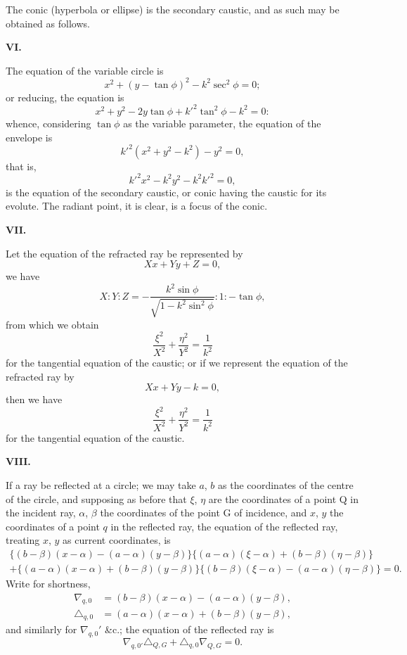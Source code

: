 \documentclass[11pt,a4paper]{article}
\begin{document}
The conic (hyperbola or ellipse) is the secondary caustic, and as such may be
obtained as follows.

\medskip
\noindent\textbf{VI.}

The equation of the variable circle is
\[x^2 + (y - \tan\phi)^2 - k^2\sec^2\phi = 0;\]
or reducing, the equation is
\[x^2 + y^2 - 2y\tan\phi + k'^2\tan^2\phi - k^2 = 0:\]
whence, considering $\tan\phi$ as the variable parameter, the equation of the envelope is
\[k'^2(x^2+y^2-k^2) - y^2 = 0,\]
that is,
\[k'^2x^2 - k^2y^2 - k^2k'^2 = 0,\]
is the equation of the secondary caustic, or conic having the caustic for its evolute.
The radiant point, it is clear, is a focus of the conic.

\medskip
\noindent\textbf{VII.}

Let the equation of the refracted ray be represented by
\[Xx + Yy + Z = 0,\]
we have
\[X : Y : Z = -\frac{k^2\sin\phi}{\sqrt{1-k^2\sin^2\phi}} : 1 : -\tan\phi,\]
from which we obtain
\[\frac{\xi^2}{X^2} + \frac{\eta^2}{Y^2} = \frac{1}{k^2}\]
for the tangential equation of the caustic; or if we represent the equation of the
refracted ray by
\[Xx + Yy - k = 0,\]
then we have
\[\frac{\xi^2}{X^2} + \frac{\eta^2}{Y^2} = \frac{1}{k^2}\]
for the tangential equation of the caustic.

\clearpage
\noindent\textbf{VIII.}

If a ray be reflected at a circle; we may take $a$, $b$ as the coordinates of
the centre of the circle, and supposing as before that $\xi$, $\eta$ are the coordinates of
a point Q in the incident ray, $\alpha$, $\beta$ the coordinates of the point G of incidence,
and $x$, $y$ the coordinates of a point $q$ in the reflected ray, the equation of the
reflected ray, treating $x$, $y$ as current coordinates, is
\begin{multline*}
\{(b-\beta)(x-\alpha) - (a-\alpha)(y-\beta)\}\{(a-\alpha)(\xi-\alpha) + (b-\beta)(\eta-\beta)\}\\
+ \{(a-\alpha)(x-\alpha) + (b-\beta)(y-\beta)\}\{(b-\beta)(\xi-\alpha) - (a-\alpha)(\eta-\beta)\} = 0.
\end{multline*}
Write for shortness,
\begin{align*}
\nabla_{q,0} &= (b-\beta)(x-\alpha) - (a-\alpha)(y-\beta),\\
\triangle_{q,0} &= (a-\alpha)(x-\alpha) + (b-\beta)(y-\beta),
\end{align*}
and similarly for $\nabla_{q,0}'$ \&c.; the equation of the reflected ray is
\[\nabla_{q,0'}\triangle_{Q,G} + \triangle_{q,0}\nabla_{Q,G} = 0.\]
\end{document}
